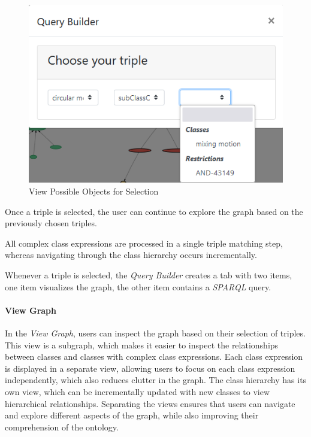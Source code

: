 \begin{figure}[H]
    \includegraphics[scale=0.4]{Graphics/OwlVisualizer/queryBuilder3.png}
    \centering
    \caption{View Possible Objects for Selection}
\end{figure}
Once a triple is selected, the user can continue to explore the graph based on the previously chosen triples.

All complex class expressions are processed in a single triple matching step, whereas navigating through the class hierarchy occurs incrementally.

Whenever a triple is selected, the \textit{Query Builder} creates a tab with two items, one item visualizes the graph, the other item 
contains a \textit{SPARQL} query. 

\paragraph{View Graph}
In the \textit{View Graph}, users can inspect the graph based on their selection of triples. 
This view is a subgraph, which makes it easier to inspect the relationships between classes and classes with complex class expressions. 
Each class expression is displayed in a separate view, allowing users to focus on each class expression independently, which also reduces clutter in the graph. 
The class hierarchy has its own view, which can be incrementally updated with new classes to view hierarchical relationships. 
Separating the views ensures that users can navigate and explore different aspects of the graph, while also improving their comprehension of the ontology.

